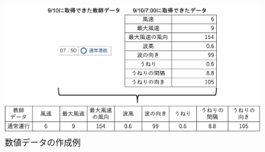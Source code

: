 \begin{figure}[H]
 \centering
 \includegraphics[keepaspectratio, scale=0.5]{fig/chapter3/value_dataset.png}
 \caption{数値データの作成例}
 \label{value_data}
\end{figure}



